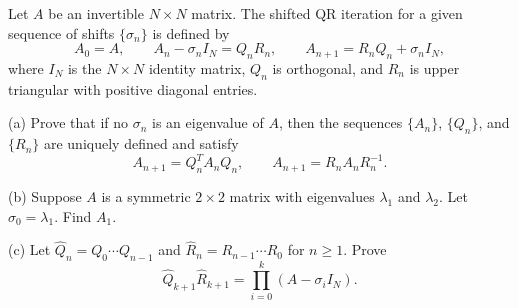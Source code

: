 \begin{exercise}
\label{applied:2026:4}
Let $A$ be an invertible $N\times N$ matrix. The shifted QR iteration for a given sequence of
shifts $\{\sigma_n\}$ is defined by
\[
A_0=A,\qquad A_n-\sigma_n I_N=Q_nR_n,\qquad
A_{n+1}=R_nQ_n+\sigma_n I_N,
\]
where $I_N$ is the $N\times N$ identity matrix, $Q_n$ is orthogonal, and $R_n$ is upper
triangular with positive diagonal entries.

(a) Prove that if no $\sigma_n$ is an eigenvalue of $A$, then the sequences $\{A_n\}$,
$\{Q_n\}$, and $\{R_n\}$ are uniquely defined and satisfy
\[
A_{n+1}=Q_n^T A_n Q_n,\qquad A_{n+1}=R_nA_nR_n^{-1}.
\]

(b) Suppose $A$ is a symmetric $2\times 2$ matrix with eigenvalues $\lambda_1$ and
$\lambda_2$. Let $\sigma_0=\lambda_1$. Find $A_1$.

(c) Let $\widehat{Q}_n=Q_0\cdots Q_{n-1}$ and
$\widehat{R}_n=R_{n-1}\cdots R_0$ for $n\geq 1$. Prove
\[
\widehat{Q}_{k+1}\widehat{R}_{k+1}
=\prod_{i=0}^k (A-\sigma_i I_N).
\]
\end{exercise}


